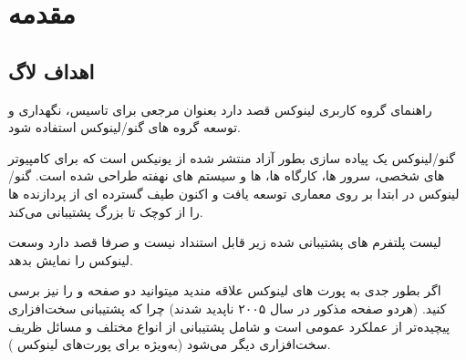 
\section{مقدمه}

\subsection{اهداف لاگ}

راهنمای گروه کاربری لینوکس قصد دارد بعنوان مرجعی برای تاسیس، نگهداری و توسعه گروه های گنو/لینوکس استفاده شود.

گنو/لینوکس یک پیاده سازی بطور آزاد منتشر شده از یونیکس است که برای کامپیوتر های شخصی، سرور ها، کارگاه ها،  ها و سیستم های نهفته طراحی شده است. گنو/لینوکس در ابتدا بر روی معماری  توسعه یافت و اکنون طیف گسترده ای از پردازنده ها را از کوچک تا بزرگ پشتیبانی می‌کند.

\begin{note}
لیست پلتفرم های پشتیبانی شده زیر قابل استنداد نیست و صرفا قصد دارد وسعت لینوکس را نمایش بدهد.
\end{note}


اگر بطور جدی به پورت های لینوکس علاقه مندید میتوانید دو صفحه
و
را نیز برسی کنید.  (هردو صفحه مذکور در سال ۲۰۰۵ ناپدید شدند)
چرا که پشتیبانی سخت‌افزاری پیچیده‌تر از عملکرد عمومی  است و شامل پشتیبانی از انواع مختلف  و مسائل ظریف سخت‌افزاری دیگر می‌شود (به‌ویژه برای پورت‌های لینوکس
).



